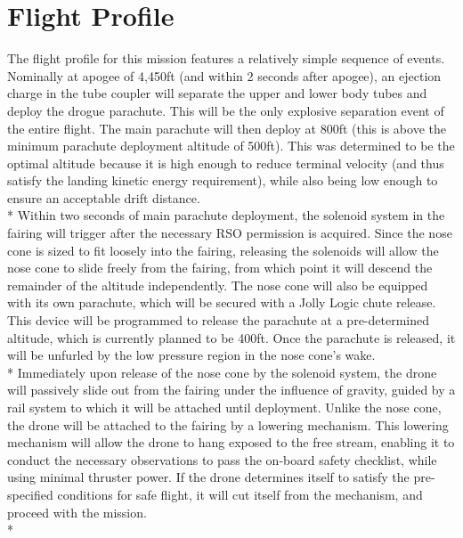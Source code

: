 \section{Flight Profile}
The flight profile for this mission features a relatively simple sequence of events.
Nominally at apogee of 4,450ft (and within 2 seconds after apogee), an ejection charge
in the tube coupler will separate the upper and lower body tubes and deploy the drogue parachute. This will be the only explosive separation event of
the entire flight. The main parachute will then deploy at 800ft (this is above the minimum
parachute deployment altitude of 500ft). This was determined to be the optimal altitude because it is high enough to reduce terminal velocity (and thus satisfy the landing kinetic energy requirement), while also being low enough to ensure an acceptable drift distance. 
\\*
\newline
Within two seconds of main parachute
deployment, the solenoid system in the fairing will trigger after the necessary RSO
permission is acquired. Since the nose cone is sized to fit loosely into the fairing, releasing the solenoids will allow the nose cone to slide freely from the fairing, from which point it will descend the remainder of the altitude independently. The nose cone will also be equipped with its own parachute, which will be secured with a Jolly Logic chute release. This device will be programmed to release the parachute at a pre-determined altitude, which is currently planned to be 400ft. Once the parachute is released, it will be unfurled by the low pressure region in the nose cone's wake. 
\\*
\newline
Immediately upon release of the nose cone by the solenoid system, the drone will passively slide out from the fairing under the influence of gravity, guided by a rail system to which it will be attached until deployment. Unlike the nose cone, the drone will be attached to the fairing by a lowering mechanism. This lowering mechanism will allow the drone to hang exposed to the free stream, enabling it to conduct the necessary observations to pass the on-board safety checklist, while using minimal thruster power. If the drone determines itself to satisfy the pre-specified conditions for safe flight, it will cut itself from the mechanism, and proceed with the mission.
\\*

